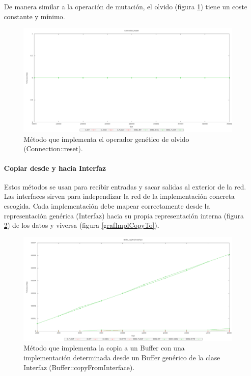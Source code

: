 \documentclass[11pt]{article}
\begin{document}
\begin{titlepage}
De manera similar a la operación de mutación, el olvido (figura \ref{grafImplReset}) tiene un coste constante y mínimo.

\begin{figure}[htb]
\centering
\includegraphics[width=\textwidth]{./img/Connection_reset.png}
\caption{\label{grafImplReset}Método que implementa el operador genético de olvido (Connection::reset).}
\end{figure}
\newpage
\paragraph{Copiar desde y hacia Interfaz}
\label{sec-6-1-1-7}


Estos métodos se usan para recibir entradas y sacar salidas al exterior de la red. Las interfaces sirven para independizar la red de la implementación concreta escogida. Cada implementación debe mapear correctamente desde la representación genérica (Interfaz) hacia su propia representación interna (figura \ref{grafImplCopyFrom}) de los datos y viversa (figura \ref{grafImplCopyTo}).

\begin{figure}[htb]
\centering
\includegraphics[width=\textwidth]{./img/Buffer_copyFromInterface.png}
\caption{\label{grafImplCopyFrom}Método que implementa la copia a un Buffer con una implementación determinada desde un Buffer genérico de la clase Interfaz (Buffer::copyFromInterface).}
\end{figure}


\end{titlepage}
\end{document}
